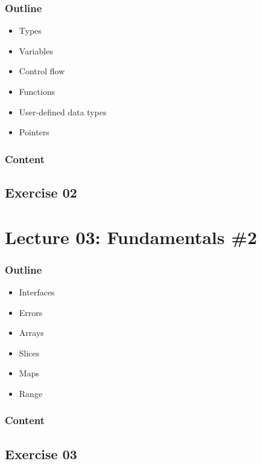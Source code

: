 \documentclass[
  digital,
  color,
  oneside,
  nosansbold,
  nocolorbold,
  lof,
  lot,
]{fithesis4}
\begin{document}
\subsubsection{Outline}

\begin{itemize}
    \item Types
    \item Variables
    \item Control flow
    \item Functions
    \item User-defined data types
    \item Pointers
\end{itemize}

\subsubsection{Content}

\subsection{Exercise 02}

\section{Lecture 03: Fundamentals \#2}

\subsubsection{Outline}

\begin{itemize}
    \item Interfaces
    \item Errors
    \item Arrays
    \item Slices
    \item Maps
    \item Range
\end{itemize}

\subsubsection{Content}

\subsection{Exercise 03}
\end{document}
